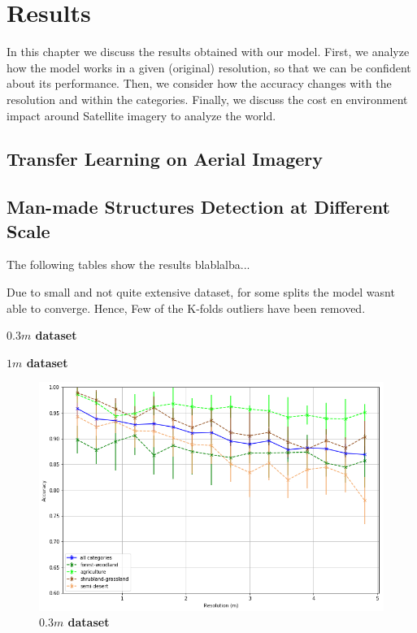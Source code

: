 
\chapter{Results} 

\label{Chapter5}


In this chapter we discuss the results obtained with our model. First, we analyze how the model works in a given (original) resolution, so that we can be confident about its performance. Then, we consider how the accuracy changes with the resolution and within the categories. Finally, we discuss the cost en environment impact around Satellite imagery to analyze the world. 

\section{Transfer Learning on Aerial Imagery}

\section{Man-made Structures Detection at Different Scale}

The following tables show the results blablalba...

Due to small and not quite extensive dataset, for some splits the model wasnt able to converge. Hence, Few of the K-folds outliers have been removed.

\begin{table}
    \centering
	
	\captionsetup{width=0.7\linewidth}
	\caption{\textbf{$0.3m$ dataset}}
\end{table}

\begin{table}
    \centering
	
	\captionsetup{width=0.7\linewidth}
	\caption{\textbf{$1m$ dataset}}
\end{table}


\begin{figure}[h!]
	\centering
	\includegraphics[width=\textwidth]{Figures/results/acc_res_all_categories_03m.png}
	\captionsetup{width=1\linewidth}
	\caption{\textbf{$0.3m$ dataset}}
	\label{fig:acc_all_cat_03m}
\end{figure}

